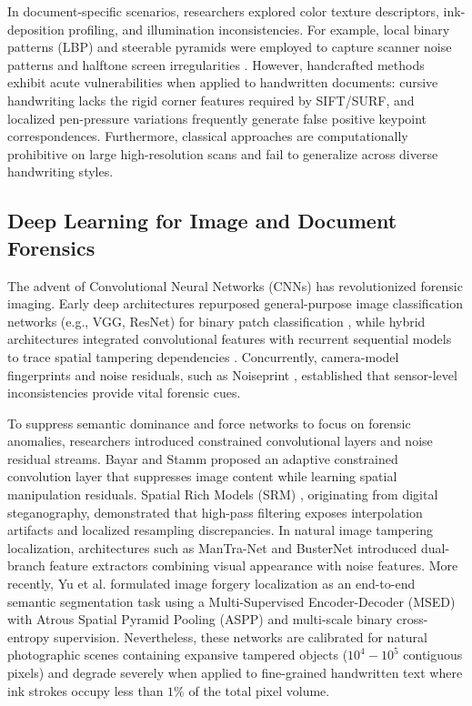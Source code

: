 \documentclass[pdflatex,sn-mathphys-num,iicol]{sn-jnl}
\begin{document}
In document-specific scenarios, researchers explored color texture descriptors, ink-deposition profiling, and illumination inconsistencies. For example, local binary patterns (LBP) and steerable pyramids were employed to capture scanner noise patterns and halftone screen irregularities \cite{bib1}. However, handcrafted methods exhibit acute vulnerabilities when applied to handwritten documents: cursive handwriting lacks the rigid corner features required by SIFT/SURF, and localized pen-pressure variations frequently generate false positive keypoint correspondences. Furthermore, classical approaches are computationally prohibitive on large high-resolution scans and fail to generalize across diverse handwriting styles.

\subsection{Deep Learning for Image and Document Forensics}\label{subsec2_2}
The advent of Convolutional Neural Networks (CNNs) has revolutionized forensic imaging. Early deep architectures repurposed general-purpose image classification networks (e.g., VGG, ResNet) for binary patch classification \cite{bib4}, while hybrid architectures integrated convolutional features with recurrent sequential models to trace spatial tampering dependencies \cite{bib5}. Concurrently, camera-model fingerprints and noise residuals, such as Noiseprint \cite{bib3}, established that sensor-level inconsistencies provide vital forensic cues.

To suppress semantic dominance and force networks to focus on forensic anomalies, researchers introduced constrained convolutional layers and noise residual streams. Bayar and Stamm \cite{bib7} proposed an adaptive constrained convolution layer that suppresses image content while learning spatial manipulation residuals. Spatial Rich Models (SRM) \cite{bib8}, originating from digital steganography, demonstrated that high-pass filtering exposes interpolation artifacts and localized resampling discrepancies. In natural image tampering localization, architectures such as ManTra-Net \cite{bib9} and BusterNet \cite{bib10} introduced dual-branch feature extractors combining visual appearance with noise features. More recently, Yu et al. \cite{bib22} formulated image forgery localization as an end-to-end semantic segmentation task using a Multi-Supervised Encoder-Decoder (MSED) with Atrous Spatial Pyramid Pooling (ASPP) and multi-scale binary cross-entropy supervision. Nevertheless, these networks are calibrated for natural photographic scenes containing expansive tampered objects ($10^4 - 10^5$ contiguous pixels) and degrade severely when applied to fine-grained handwritten text where ink strokes occupy less than $1\%$ of the total pixel volume.
\end{document}

